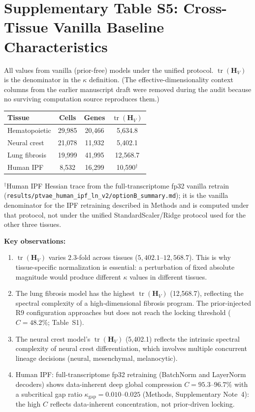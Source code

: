 \documentclass[11pt,a4paper]{article}
\newcommand{\Hmat}{\mathbf{H}}\newcommand{\trloss}{\operatorname{tr}}
\begin{document}
\section*{Supplementary Table S5: Cross-Tissue Vanilla Baseline Characteristics}
\label{tab:s5_vanilla}

All values from vanilla (prior-free) models under the unified protocol. $\trloss(\Hmat_V)$ is the denominator in the $\kappa$ definition. (The effective-dimensionality context columns from the earlier manuscript draft were removed during the audit because no surviving computation source reproduces them.)

\vspace{0.5cm}
\begin{tabular}{lccc}
\toprule
\textbf{Tissue} & \textbf{Cells} & \textbf{Genes} & \textbf{$\trloss(\Hmat_V)$} \\
\midrule
Hematopoietic & 29,985 & 20,466 & 5,634.8 \\
Neural crest  & 21,078 & 11,932 & 5,402.1 \\
Lung fibrosis & 19,999 & 41,995 & 12,568.7 \\
Human IPF     & 8,532  & 16,299 & 10,590$^{\dagger}$ \\
\bottomrule
\end{tabular}

\vspace{0.5cm}
$^{\dagger}$Human IPF Hessian trace from the full-transcriptome fp32 vanilla retrain (\texttt{results/ptvae\_human\_ipf\_ln\_v2/optionB\_summary.md}); it is the vanilla denominator for the IPF retraining described in Methods and is computed under that protocol, not under the unified StandardScaler/Ridge protocol used for the other three tissues.

\vspace{0.5cm}
\textbf{Key observations:}
\begin{enumerate}
\item $\trloss(\Hmat_V)$ varies $2.3$-fold across tissues ($5{,}402.1$--$12{,}568.7$). This is why tissue-specific normalization is essential: a perturbation of fixed absolute magnitude would produce different $\kappa$ values in different tissues.
\item The lung fibrosis model has the highest $\trloss(\Hmat_V)$ (12,568.7), reflecting the spectral complexity of a high-dimensional fibrosis program. The prior-injected R9 configuration approaches but does not reach the locking threshold ($C=48.2\%$; Table~S1).
\item The neural crest model's $\trloss(\Hmat_V)$ (5,402.1) reflects the intrinsic spectral complexity of neural crest differentiation, which involves multiple concurrent lineage decisions (neural, mesenchymal, melanocytic).
\item Human IPF: full-transcriptome fp32 retraining (BatchNorm and LayerNorm decoders) shows data-inherent deep global compression $C=95.3$--$96.7\%$ with a subcritical gap ratio $\kappa_{\mathrm{gap}}=0.010$--$0.025$ (Methods, Supplementary Note~4): the high $C$ reflects data-inherent concentration, not prior-driven locking.
\end{enumerate}
\end{document}
